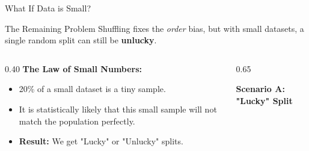 \begin{frame}{What If Data is Small?}

    \begin{block}{The Remaining Problem}
        Shuffling fixes the \textit{order} bias, but with small datasets, a single random split can still be \textbf{unlucky}.
    \end{block}

    
    \begin{columns}[c]
        \begin{column}{0.40\textwidth}
            \textbf{The Law of Small Numbers:}
            
            \begin{itemize}
                \item 20\% of a small dataset is a tiny sample.
                \item It is statistically likely that this small sample will not match the population perfectly.
                \item \textbf{Result:} We get "Lucky" or "Unlucky" splits.
            \end{itemize}
        \end{column}
        
        \begin{column}{0.65\textwidth}
            \centering
            
            
            \vspace{0.5em}
            
            \textbf{Scenario A: "Lucky" Split}
            \vspace{0.2em}
\end{column}
\end{columns}
\end{frame}
